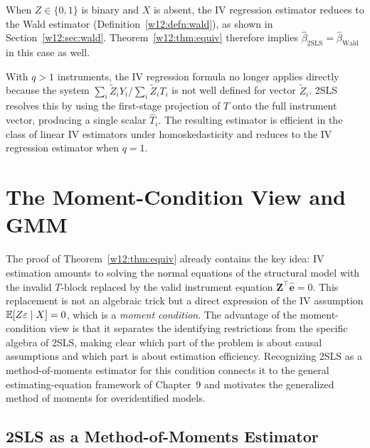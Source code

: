 \documentclass[master.tex]{subfiles}
\begin{document}
\begin{remark}
\label{w12:rem:wald-special}
When $Z \in \{0,1\}$ is binary and $X$ is absent, the IV regression
estimator reduces to the Wald estimator
(Definition~\ref{w12:defn:wald}), as shown in
Section~\ref{w12:sec:wald}.  Theorem~\ref{w12:thm:equiv} therefore
implies $\hat\beta_{\mathrm{2SLS}} = \hat\beta_{\mathrm{Wald}}$ in
this case as well.
\end{remark}

\begin{remark}
With $q > 1$ instruments, the IV regression formula no longer applies
directly because the system $\sum_i \tilde{Z}_i Y_i / \sum_i
\tilde{Z}_i T_i$ is not well defined for vector $\tilde{Z}_i$.  2SLS
resolves this by using the first-stage projection of $T$ onto the
full instrument vector, producing a single scalar $\hat{T}_i$.  The
resulting estimator is efficient in the class of linear IV estimators
under homoskedasticity and reduces to the IV regression estimator when
$q = 1$.
\end{remark}


\section{The Moment-Condition View and GMM}
\label{w12:sec:gmm}

The proof of Theorem~\ref{w12:thm:equiv} already contains the key
idea: IV estimation amounts to solving the normal equations of the
structural model with the invalid $T$-block replaced by the valid
instrument equation $\mathbf{Z}^\top\hat{\mathbf{e}} = 0$.  This
replacement is not an algebraic trick but a direct expression of the
IV assumption $\mathbb{E}[Z\varepsilon \mid X] = 0$, which is a
\emph{moment condition}.  The advantage of the moment-condition view
is that it separates the identifying restrictions from the specific
algebra of 2SLS, making clear which part of the problem is about
causal assumptions and which part is about estimation efficiency.
Recognizing 2SLS as a method-of-moments estimator for this condition
connects it to the general estimating-equation framework of Chapter~9
and motivates the generalized method of moments for overidentified
models.

\subsection{2SLS as a Method-of-Moments Estimator}
\end{document}
